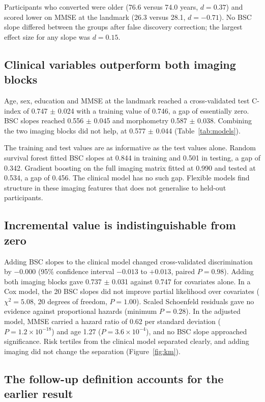 \documentclass[blue]{ludusofficial}
\begin{document}
Participants who converted were older (76.6 versus 74.0 years, $d = 0.37$) and scored lower on MMSE at the landmark (26.3 versus 28.1, $d = -0.71$). No BSC slope differed between the groups after false discovery correction; the largest effect size for any slope was $d = 0.15$.

\subsection{Clinical variables outperform both imaging blocks}

Age, sex, education and MMSE at the landmark reached a cross-validated test C-index of 0.747 $\pm$ 0.024 with a training value of 0.746, a gap of essentially zero. BSC slopes reached 0.556 $\pm$ 0.045 and morphometry 0.587 $\pm$ 0.038. Combining the two imaging blocks did not help, at 0.577 $\pm$ 0.044 (Table~\ref{tab:models}).

The training and test values are as informative as the test values alone. Random survival forest fitted BSC slopes at 0.844 in training and 0.501 in testing, a gap of 0.342. Gradient boosting on the full imaging matrix fitted at 0.990 and tested at 0.534, a gap of 0.456. The clinical model has no such gap. Flexible models find structure in these imaging features that does not generalise to held-out participants.

\subsection{Incremental value is indistinguishable from zero}

Adding BSC slopes to the clinical model changed cross-validated discrimination by $-0.000$ (95\% confidence interval $-0.013$ to $+0.013$, paired $P = 0.98$). Adding both imaging blocks gave 0.737 $\pm$ 0.031 against 0.747 for covariates alone. In a Cox model, the 20 BSC slopes did not improve partial likelihood over covariates ($\chi^2 = 5.08$, 20 degrees of freedom, $P = 1.00$). Scaled Schoenfeld residuals gave no evidence against proportional hazards (minimum $P = 0.28$). In the adjusted model, MMSE carried a hazard ratio of 0.62 per standard deviation ($P = 1.2 \times 10^{-18}$) and age 1.27 ($P = 3.6 \times 10^{-4}$), and no BSC slope approached significance. Risk tertiles from the clinical model separated clearly, and adding imaging did not change the separation (Figure~\ref{fig:km}).

\subsection{The follow-up definition accounts for the earlier result}
\end{document}
